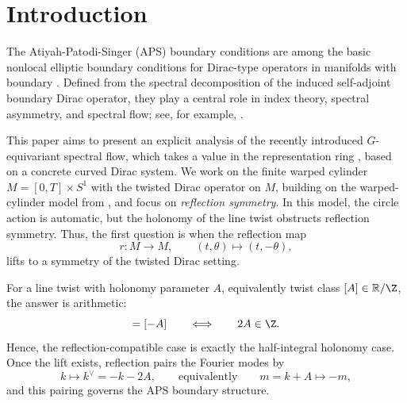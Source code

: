 \documentclass[11pt]{article}
\newcommand{\R}{\mathbb{R}}
\theoremstyle{definition}
\numberwithin{equation}{section}
\begin{document}
\setcounter{tocdepth}{2}
\tableofcontents


\section{Introduction}

The Atiyah-Patodi-Singer (APS) boundary conditions are among the basic nonlocal elliptic boundary conditions for Dirac-type operators in manifolds with boundary \cite{APS1,APS2,APS3}. Defined from the spectral decomposition of the induced self-adjoint boundary Dirac operator, they play a central role in index theory, spectral asymmetry, and spectral flow; see, for example, \cite{LawsonMichelsohn,BGV,BoossWojciechowski1993,BaerBallmann2012}. %

This paper aims to present an explicit analysis of the recently introduced $G$-equivariant spectral flow, which takes a value in the representation ring \cite{Fang,IzydorekJanczewskaWaterstraat2021,IzydorekJanczewskaStarostkaWaterstraat2026}, based on a concrete curved Dirac system.
We work on the finite warped cylinder $M=[0,T]\times S^1$ with the twisted Dirac operator on \(M\), building on the warped-cylinder model from \cite{KS}, and focus on \emph{reflection symmetry}. In this model, the circle action is automatic, but the holonomy of the line twist obstructs reflection symmetry. Thus, the first question is when the reflection map
\begin{equation}
r \colon M \to M, \qquad (t,\theta)\mapsto (t,-\theta),
\end{equation}
lifts to a symmetry of the twisted Dirac setting.


For a line twist with holonomy parameter \(A\), equivalently twist class \([A]\in \R/\Z\), the answer is arithmetic:
\begin{equation}
[A]=[-A]
\qquad\Longleftrightarrow\qquad
2A\in\Z.
\end{equation}
Hence, the reflection-compatible case is exactly the half-integral holonomy case. Once the lift exists, reflection pairs the Fourier modes by
\begin{equation}
k\longmapsto k^\vee=-k-2A,
\qquad\text{equivalently}\qquad
m=k+A\longmapsto -m,
\end{equation}
and this pairing governs the APS boundary structure.
\end{document}
